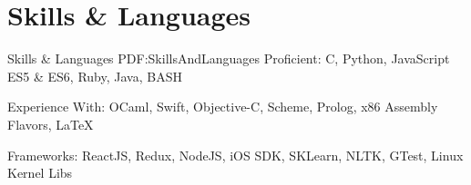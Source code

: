 \section
{Skills \&\newline
Languages}
{Skills \& Languages}
{PDF:SkillsAndLanguages}
\BulletItem
Proficient: C, Python, JavaScript ES5 \& ES6, Ruby, Java, BASH

\GapNoBreak
\BulletItem
Experience With: OCaml, Swift, Objective-C, Scheme, Prolog, x86 Assembly Flavors, {\LaTeX}

\GapNoBreak
\BulletItem
Frameworks: ReactJS, Redux, NodeJS, iOS SDK, SKLearn, NLTK, GTest, Linux Kernel Libs
